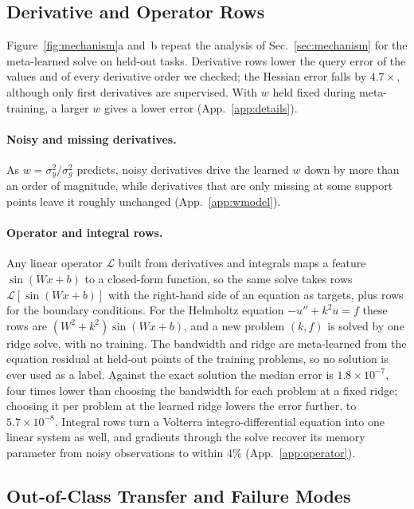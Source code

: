 \documentclass[fullpaper,final]{nldl}
\theoremstyle{plain}
\theoremstyle{definition}
\begin{document}
\subsection{Derivative and Operator Rows}
\label{sec:exp-mechanism}

Figure~\ref{fig:mechanism}a and~b repeat the analysis of Sec.~\ref{sec:mechanism} for the
meta-learned solve on held-out tasks. Derivative rows lower the query error of the
values and of every derivative order we checked; the Hessian error falls by
$4.7\times$, although only first derivatives are supervised. With $w$ held fixed
during meta-training, a larger $w$ gives a lower error (App.~\ref{app:details}).

\paragraph{Noisy and missing derivatives.}
As $w = \sigma_y^2/\sigma_g^2$ predicts, noisy derivatives drive the learned $w$
down by more than an order of magnitude, while derivatives that are only missing at some support points leave it
roughly unchanged (App.~\ref{app:wmodel}).

\paragraph{Operator and integral rows.}
Any linear operator $\mathcal{L}$ built from derivatives and integrals maps a
feature $\sin(Wx+b)$ to a closed-form function, so the same solve takes rows
$\mathcal{L}[\sin(Wx+b)]$ with the right-hand side of an equation as targets, plus
rows for the boundary conditions. For
the Helmholtz equation $-u''+k^2u=f$ these rows are $(W^2+k^2)\sin(Wx+b)$, and a
new problem $(k,f)$ is solved by one ridge solve, with no training. The bandwidth
and ridge are meta-learned from the equation residual at held-out points of the
training problems, so no solution is ever used as a label. Against the exact
solution the median error is $1.8\times10^{-7}$, four times lower than choosing the
bandwidth for each problem at a fixed ridge; choosing it per problem at the learned
ridge lowers the error further, to $5.7\times10^{-8}$. Integral rows turn a
Volterra integro-differential equation into one linear system as well, and
gradients through the solve recover its memory parameter from noisy observations to
within $4\%$ (App.~\ref{app:operator}).

\subsection{Out-of-Class Transfer and Failure Modes}
\label{sec:exp-limits}
\end{document}
